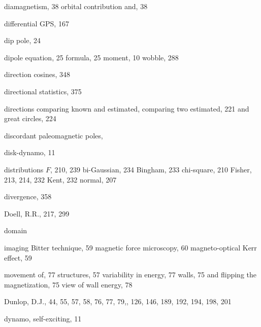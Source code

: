 \documentclass[,plain]{tauxe}
\begin{document}
\begin{theindex}
  \item diamagnetism, 38
    \subitem orbital contribution and, 38
  \item differential GPS, 167
  \item dip pole, 24
  \item dipole
    \subitem equation, 25
    \subitem formula, 25
    \subitem moment, 10
  \subitem wobble, 288
  \item direction cosines, 348
  \item directional statistics, 375
  \item directions
       \subitem comparing known and estimated,
	   \subitem comparing two estimated, 221
	   \subitem and great circles, 224
\item discordant paleomagnetic poles,
  \item disk-dynamo, 11
  \item distributions
    \subitem $F$, 210, 239
    \subitem bi-Gaussian, 234
    \subitem Bingham, 233
    \subitem chi-square, 210
    \subitem Fisher, 213, 214, 232
    \subitem Kent, 232
    \subitem normal, 207
  \item divergence, 358
  \item Doell, R.R., 217, 299
  \item domain
    
  \subitem imaging
    \subsubitem Bitter technique, 59
    \subsubitem magnetic force microscopy, 60
    \subsubitem magneto-optical Kerr effect, 59

\subitem movement of, 77
\subitem structures, 57
\subitem variability in energy, 77
  \subitem walls, 75
    \subsubitem and flipping the magnetization, 75
    \subsubitem view of wall energy, 78
  \item Dunlop, D.J., 44, 55, 57, 58, 76, 77, 79,, 126, 146, 189, 
		192, 194, 198, 201
  \item dynamo, self-exciting, 11

  \indexspace


\end{theindex}
\end{document}
